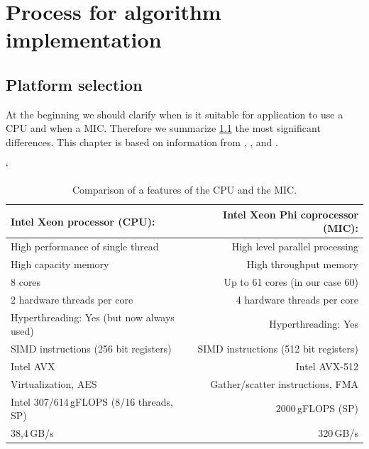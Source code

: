 \chapter{Process for algorithm implementation}

\section{Platform selection}
At the beginning we should clarify when is it suitable for application to use a CPU and when a MIC. Therefore we summarize \ref{tab:table_comparasion_features} the most significant differences. This chapter is based on information from \cite{xeon_phi_book}, \cite{intel_phi_architecture}, \cite{intel_compiler_pragmas} and \cite{openmp}.

\begin{table}[ht]
\catcode`
\begin{center}
\begin{tabular}{| l | r |} \hline
{\large \textbf{Intel Xeon processor (CPU):}} & \large{\textbf{Intel Xeon Phi coprocessor (MIC):}}\\ \hline
High performance of single thread & High level parallel processing\\ \hline
High capacity memory & High throughput memory\\ \hline
8 cores & Up to 61 cores (in our case 60)\\ \hline
2 hardware threads per core & 4 hardware threads per core\\ \hline
Hyperthreading: Yes (but now always used) & Hyperthreading: Yes\\ \hline
SIMD instructions (256 bit registers) & SIMD instructions (512 bit registers)\\ \hline
Intel AVX & Intel AVX-512\\ \hline
Virtualization, AES & Gather/scatter instructions, FMA\\ \hline
Intel 307/614\,gFLOPS (8/16 threads, SP) & 2000\,gFLOPS (SP)\\ \hline
38,4\,GB/s & 320\,GB/s\\ \hline

\end{tabular}
\caption{Comparison of a features of the CPU and the MIC.}
\label{tab:table_comparasion_features}
\end{center}
\end{table}

